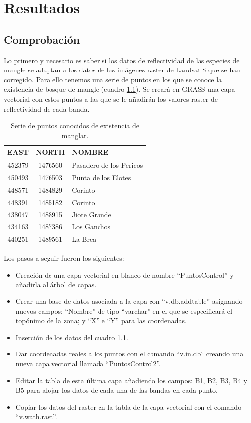 


\chapter{Resultados}
\label{cap:resultados}

\section{Comprobación}
Lo primero y necesario es saber si los datos de reflectividad de las especies de mangle se adaptan a los datos de las imágenes raster de Landsat 8 que se han corregido. Para ello tenemos una serie de puntos en los que se conoce la existencia de bosque de mangle (cuadro \ref{tab:puntos}). Se creará en GRASS una capa vectorial con estos puntos a las que se le añadirán los valores raster de reflectividad de cada banda.\Sep

\begin{table}
	\centering
	\caption[Puntos de control]{Serie de puntos conocidos de existencia de manglar.}
	\begin{tabular}{|c|c|l|}
	\hline
	EAST & NORTH & NOMBRE\\
	\hline
	452379 & 1476560 & Pasadero de los Pericos\\
	\hline
	450493 & 1476503 & Punta de los Elotes\\
	\hline
	448571 & 1484829 & Corinto\\
	\hline
	448391 & 1485182 & Corinto\\
	\hline
	438047 & 1488915 & Jiote Grande\\
	\hline
	434163 & 1487386 & Los Ganchos\\
	\hline
	440251 & 1489561 & La Brea\\
	\hline
	\end{tabular}
	\label{tab:puntos}
\end{table}

Los pasos a seguir fueron los siguientes:

\begin{itemize}
	\item Creación de una capa vectorial en blanco de nombre ``PuntosControl'' y añadirla al árbol de capas.
	\item Crear una base de datos asociada a la capa con ``v.db.addtable'' asignando nuevos campos: ``Nombre'' de tipo ``varchar'' en el que se especificará el topónimo de la zona; y ``X'' e ``Y'' para las coordenadas.
	\item Inserción de los datos del cuadro \ref{tab:puntos}.
	\item Dar coordenadas reales a los puntos con el comando ``v.in.db'' creando una nueva capa vectorial llamada ``PuntosControl2''.
	\item Editar la tabla de esta última capa añadiendo los campos: B1, B2, B3, B4 y B5 para alojar los datos de cada una de las bandas en cada punto.
	\item Copiar los datos del raster en la tabla de la capa vectorial con el comando ``v.wath.rast''.
\end{itemize}

